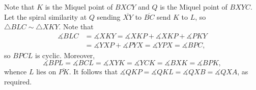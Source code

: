 Note that $K$ is the Miquel point of $BXCY$ and $Q$ is the Miquel point of $BXYC$. Let the spiral similarity at $Q$ sending $\overline{XY}$ to $\overline{BC}$ send $K$ to $L$, so $\triangle BLC\sim\triangle XKY$. Note that
\begin{align*}
    \measuredangle BLC&=\measuredangle XKY=\measuredangle XKP+\measuredangle XKP+\measuredangle PKY\\
    &=\measuredangle YXP+\measuredangle PYX=\measuredangle YPX=\measuredangle BPC,
\end{align*}
so $BPCL$ is cyclic. Moreover, \[\measuredangle BPL=\measuredangle BCL=\measuredangle XYK=\measuredangle YCK=\measuredangle BXK=\measuredangle BPK,\]
whence $L$ lies on $\overline{PK}$. It follows that $\measuredangle QKP=\measuredangle QKL=\measuredangle QXB=\measuredangle QXA$, as required.
